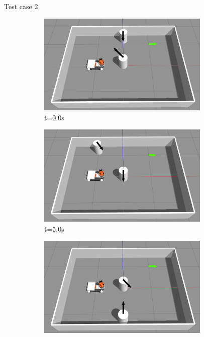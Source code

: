 \documentclass{beamer}
\begin{document}
\begin{frame}[t]{\huge{Test case 2}}
    \begin{figure}[H]
        \centering
        \begin{subfigure}[b]{0.50\linewidth}
            \centering
            \includegraphics[width=0.90\textwidth]{../report/images/test_case_2/exp1.png}
            \caption{t=0.0s}
        \end{subfigure}%
        \begin{subfigure}[b]{0.50\linewidth}
            \centering
            \includegraphics[width=0.90\textwidth]{../report/images/test_case_2/exp2.png}
            \caption{t=5.0s}
        \end{subfigure}
        \begin{subfigure}[b]{0.50\linewidth}
            \centering
            \includegraphics[width=0.90\textwidth]{../report/images/test_case_2/exp3.png}

\end{subfigure}
\end{figure}
\end{frame}
\end{document}
